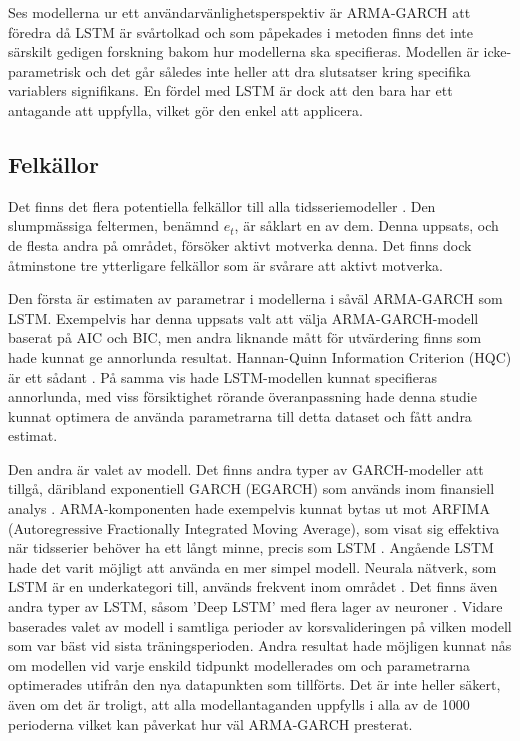 \documentclass[11pt]{article}
\numberwithin{equation}{section}
\numberwithin{table}{section}
\numberwithin{figure}{section}
\begin{document}
Ses modellerna ur ett användarvänlighetsperspektiv är ARMA-GARCH att föredra då LSTM är svårtolkad och som påpekades i metoden finns det inte särskilt gedigen forskning bakom hur modellerna ska specifieras. Modellen är icke-parametrisk och det går således inte heller att dra slutsatser kring specifika variablers signifikans. En fördel med LSTM är dock att den bara har ett antagande att uppfylla, vilket gör den enkel att applicera. 

\subsection{Felkällor}
Det finns det flera potentiella felkällor till alla tidsseriemodeller \parencite[][,s.452 f.]{hyndman2018forecasting}. Den slumpmässiga feltermen, benämnd \(e_t\), är såklart en av dem. Denna uppsats, och de flesta andra på området, försöker aktivt motverka denna. Det finns dock åtminstone tre ytterligare felkällor som är svårare att aktivt motverka. 

Den första är estimaten av parametrar i modellerna i såväl ARMA-GARCH som LSTM. Exempelvis har denna uppsats valt att välja ARMA-GARCH-modell baserat på AIC och BIC, men andra liknande mått för utvärdering finns som hade kunnat ge annorlunda resultat. Hannan-Quinn Information Criterion (HQC) är ett sådant \parencite{hannan1979determination}. På samma vis hade LSTM-modellen kunnat specifieras annorlunda, med viss försiktighet rörande överanpassning hade denna studie kunnat optimera de använda parametrarna till detta dataset och fått andra estimat. 

Den andra är valet av modell. Det finns andra typer av GARCH-modeller att tillgå, däribland exponentiell GARCH (EGARCH) som används inom finansiell analys \parencite{nelson1991conditional}. ARMA-komponenten hade exempelvis kunnat bytas ut mot ARFIMA (Autoregressive Fractionally Integrated Moving Average), som visat sig effektiva när tidsserier behöver ha ett långt minne, precis som LSTM \parencite{taqqu1995estimators}. Angående LSTM hade det varit möjligt att använda en mer simpel modell. Neurala nätverk, som LSTM är en underkategori till, används frekvent inom området \parencite[se t.ex.][]{rather2015recurrent, li2010applications}. Det finns även andra typer av LSTM, såsom 'Deep LSTM' med flera lager av neuroner \parencite[se applikation i][]{hansson2017stock}. Vidare baserades valet av modell i samtliga perioder av korsvalideringen på vilken modell som var bäst vid sista träningsperioden. Andra resultat hade möjligen kunnat nås om modellen vid varje enskild tidpunkt modellerades om och parametrarna optimerades utifrån den nya datapunkten som tillförts. Det är inte heller säkert, även om det är troligt, att alla modellantaganden uppfylls i alla av de 1000 perioderna vilket kan påverkat hur väl ARMA-GARCH presterat.  
\end{document}
